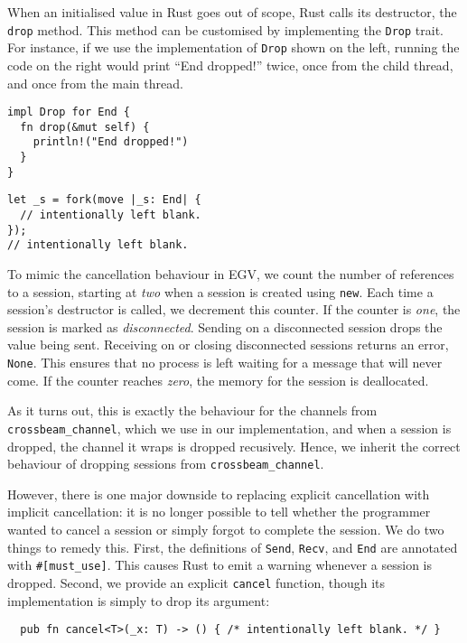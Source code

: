 \documentclass[copyright,creativecommons]{eptcs}
\begin{document}
When an initialised value in Rust goes out of scope, Rust calls its destructor, the \lstinline{drop} method. This method can be customised by implementing the \lstinline{Drop} trait. For instance, if we use the implementation of \lstinline{Drop} shown on the left, running the code on the right would print ``End dropped!'' twice, once from the child thread, and once from the main thread.

\vspace{-0.5\baselineskip}
\begin{minipage}[t]{0.5\linewidth}
\begin{lstlisting}
impl Drop for End {
  fn drop(&mut self) {
    println!("End dropped!")
  }
}
\end{lstlisting}
\end{minipage}%
\begin{minipage}[t]{0.5\linewidth}
\begin{lstlisting}
let _s = fork(move |_s: End| {
  // intentionally left blank.
});
// intentionally left blank.
\end{lstlisting}
\end{minipage}
\vspace{-0.25\baselineskip}

\noindent
To mimic the cancellation behaviour in EGV, we count the number of references to a session, starting at \emph{two} when a session is created using \lstinline{new}. Each time a session's destructor is called, we decrement this counter. If the counter is \emph{one}, the session is marked as \emph{disconnected}. Sending on a disconnected session drops the value being sent. Receiving on or closing disconnected sessions returns an error, \ie \lstinline{None}. This ensures that no process is left waiting for a message that will never come. If the counter reaches \emph{zero}, the memory for the session is deallocated.

As it turns out, this is exactly the behaviour for the channels from \lstinline{crossbeam_channel}, which we use in our implementation, and when a session is dropped, the channel it wraps is dropped recusively. Hence, we inherit the correct behaviour of dropping sessions from \lstinline{crossbeam_channel}.

However, there is one major downside to replacing explicit cancellation with implicit cancellation: it is no longer possible to tell whether the programmer wanted to cancel a session or simply forgot to complete the session. We do two things to remedy this. First, the definitions of \lstinline{Send}, \lstinline{Recv}, and \lstinline{End} are annotated with \lstinline{#[must_use]}. This causes Rust to emit a warning whenever a session is dropped. Second, we provide an explicit \lstinline{cancel} function, though its implementation is simply to drop its argument:
\begin{lstlisting}
  pub fn cancel<T>(_x: T) -> () { /* intentionally left blank. */ }
\end{lstlisting}
\end{document}
